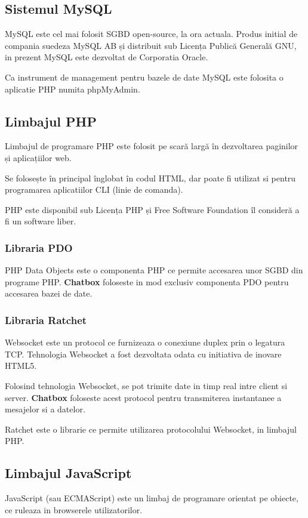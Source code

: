\documentclass[12pt,a4paper]{article}
\begin{document}
\subsection{Sistemul MySQL}
MySQL\cite{mysql} este cel mai folosit SGBD\citep{sgbd} open-source, 
la ora actuala. Produs initial de compania suedeza MySQL AB 
și distribuit sub Licența Publică Generală GNU\cite{free}, 
in prezent MySQL este dezvoltat
de Corporatia Oracle.

Ca instrument de management pentru bazele de date MySQL
este folosita o aplicatie PHP numita phpMyAdmin.

\subsection{Limbajul PHP}
Limbajul de programare PHP\citep{php} este folosit pe scară largă 
în dezvoltarea paginilor și aplicațiilor web.

Se folosește în principal înglobat în codul HTML, dar poate fi 
utilizat si pentru programarea aplicatiilor CLI (linie de comanda).

PHP este disponibil sub Licenṭa PHP ṣi Free Software Foundation 
îl consideră a fi un software liber\citep{free}.

\subsubsection{Libraria PDO}
PHP Data Objects\citep{pdo} este o componenta PHP ce permite accesarea unor SGBD din
programe PHP. \textbf{Chatbox} foloseste in mod exclusiv componenta PDO pentru 
accesarea bazei de date. 

\subsubsection{Libraria Ratchet}
Websocket\citep{websocket} este un protocol ce furnizeaza o conexiune duplex prin o legatura TCP. Tehnologia Websocket a fost dezvoltata odata cu initiativa de 
inovare HTML5. 

Folosind tehnologia Websocket, se pot trimite date in timp real intre 
client si server. \textbf{Chatbox} foloseste acest protocol pentru
transmiterea instantanee a mesajelor si a datelor.

Ratchet\citep{ratchet} este o librarie ce permite utilizarea protocolului 
Websocket, in limbajul PHP.

\subsection{Limbajul JavaScript}
JavaScript (sau ECMAScript) este un limbaj de programare orientat pe obiecte\citep{javascript}, ce ruleaza in browserele utilizatorilor. 
\end{document}
